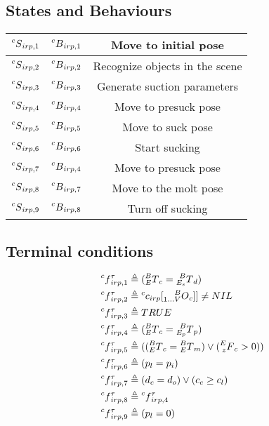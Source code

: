 \documentclass[12pt]{article}
\begin{document}
	\subsection{States and Behaviours}
		\begin{center}
\begin{tabular}{ | c | c| c |}
\hline
$\prescript{c}{}S_{irp, 1}$ & $\prescript{c}{}{B}_{irp, 1}$ & Move to initial pose \\
\hline
$\prescript{c}{}S_{irp, 2}$ & $\prescript{c}{}{B}_{irp, 2}$ & Recognize objects in the scene \\
\hline
$\prescript{c}{}S_{irp, 3}$ & $\prescript{c}{}{B}_{irp, 3}$ & Generate suction parameters\\
\hline
$\prescript{c}{}S_{irp, 4}$ & $\prescript{c}{}{B}_{irp, 4}$ & Move to presuck pose \\
\hline
$\prescript{c}{}S_{irp, 5}$ & $\prescript{c}{}{B}_{irp, 5}$ & Move to suck pose \\
\hline
$\prescript{c}{}S_{irp, 6}$ & $\prescript{c}{}{B}_{irp, 6}$ & Start sucking \\
\hline
$\prescript{c}{}S_{irp, 7}$ & $\prescript{c}{}{B}_{irp, 4}$ & Move to presuck pose \\
\hline
$\prescript{c}{}S_{irp, 8}$ & $\prescript{c}{}{B}_{irp, 7}$ & Move to the molt pose\\
\hline
$\prescript{c}{}S_{irp, 9}$ & $\prescript{c}{}{B}_{irp, 8}$ & Turn off sucking \\
\hline

\end{tabular}
\end{center}
	\subsection{Terminal conditions}
\begin{align}
    \prescript{c}{}{f}_{irp, 1}^{\tau} & \triangleq (\prescript{B}{E}{T}_c = \prescript{B}{E_s}T_d) \\
    \prescript{c}{}{f}_{irp, 2}^{\tau} & \triangleq \prescript{c}{}c_{irp}\lbrack \prescript{B}{1 \dots V}{O}_c \rbrack \rbrack \neq NIL \\
    \prescript{c}{}{f}_{irp, 3}^{\tau} & \triangleq TRUE \\
    \prescript{c}{}{f}_{irp, 4}^{\tau} & \triangleq ( \prescript{B}{E}{T}_c = \prescript{B}{E_p}{T}_p )\\
    \prescript{c}{}{f}_{irp, 5}^{\tau} & \triangleq (( \prescript{B}{E}{T}_c = \prescript{B}{E}{T}_m ) \vee (\prescript{E}{z}F_c > 0)   )\\
        \prescript{c}{}{f}_{irp, 6}^{\tau} & \triangleq (p_l = p_i) \\
    \prescript{c}{}{f}_{irp, 7}^{\tau} & \triangleq (d_c = d_o) \vee (c_c \geq c_l) \\
    \prescript{c}{}{f}_{irp, 8}^{\tau} & \triangleq  \prescript{c}{}{f}_{irp, 4}^{\tau} \\
        \prescript{c}{}{f}_{irp, 9}^{\tau} & \triangleq (p_l = 0) \\
\end{align}
\end{document}

